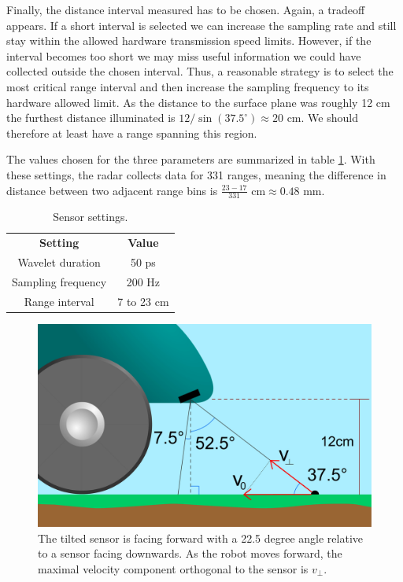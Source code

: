 Finally, the distance interval measured has to be chosen. Again, a tradeoff appears. If a short interval is selected we can increase the sampling rate and still stay within the allowed hardware transmission speed limits. However, if the interval becomes too short we may miss useful information we could have collected outside the chosen interval. Thus, a reasonable strategy is to select the most critical range interval and then increase the sampling frequency to its hardware allowed limit. As the distance to the surface plane was roughly 12 cm the furthest distance illuminated is $12/\sin(37.5^\circ)\approx 20$ cm. We should therefore at least have a range spanning this region. 

The values chosen for the three parameters are summarized in table \ref{tab:sensor_settings}. With these settings, the radar collects data for 331 ranges, meaning the difference in distance between two adjacent range bins is $\frac{23-17}{331}\textrm{ cm}\approx0.48 \textrm{ mm}$.

\begin{table}
\begin{center}
	\begin{tabular}{|c|c|}
	  	\hline
	  	\cellcolor{gray!150}\color{white}\textbf{Setting} & \cellcolor{gray!150}\color{white}\textbf{Value} \\
	 	 Wavelet duration & 50 ps \\
	  	\cellcolor{gray!25}Sampling frequency & \cellcolor{gray!25}200 Hz \\
	  	Range interval & 7 to 23 cm \\ 
		\hline
  	\end{tabular}	
\end{center}
\caption{Sensor settings.}
\label{tab:sensor_settings}
\end{table}



\begin{figure}[h]
	\centering
	\includegraphics[scale=0.30]{figs_temp/sensor_placement.jpg}
	\caption{The tilted sensor is facing forward with a 22.5 degree angle relative to a sensor facing downwards. As the robot moves forward, the maximal velocity component orthogonal to the sensor is $v_\perp$.}
	\label{fig:sensor_placement}
\end{figure}

